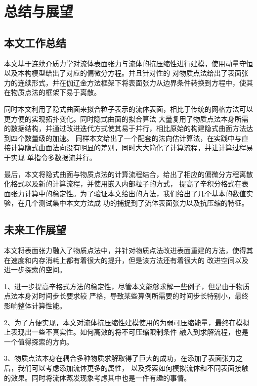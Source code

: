 \chapter{总结与展望}
\section{本文工作总结}
本文基于连续介质力学对流体表面张力与流体的抗压缩性进行建模，使用动量守恒以及本构模型给出了对应的偏微分方程。并且针对性的
对物质点法给出了表面张力的连续形式，并在伽辽金方法框架下将表面张力从边界条件转换到方程中，使其在物质点法的框架下易于离散。

同时本文利用了隐式曲面来拟合粒子表示的流体表面，相比于传统的网格方法可以更方便的实现拓扑变化。同时隐式曲面的拟合算法
大量复用了物质点法本身所需的数据结构，并通过改进迭代方式使其易于并行，相比原始的构建隐式曲面方法达到四个数量级的加速。
同样本文给出了一个配套的法向估计算法，在实践中与直接计算隐式曲面法向没有明显的差别，同时大大简化了计算流程，并让计算过程易于实现
单指令多数据流并行。

最后，本文将隐式曲面与物质点法的计算流程结合，给出了相应的偏微分方程离散化格式以及新的计算流程，并使用嵌入内部粒子的方式，
提高了辛积分格式在表面张力计算中的稳定性。为了验证本文给出的方法，我们给出了几个基本的数值实验，在几个测试集中本文方法成
功的捕捉到了流体表面张力以及抗压缩的特征。
\section{未来工作展望}
本文将表面张力融入了物质点法中，并针对物质点法改进表面重建的方法，使得其在速度和内存消耗上都有着很大的提升，但是该方法还有着很大的
改进空间以及进一步探索的空间。

1、进一步提高辛格式方法的稳定性，尽管本文能够求解一些例子，但是由于物质点法本身对时间步长要求较
严格，导致某些算例所需要的时间步长特别小，最终影响整体计算性能。

2、为了方便实现，本文对流体抗压缩性建模使用的为弱可压缩能量，最终在模拟上表现出一些不真实性。如何高效的将不可压缩限制条件
融入到求解流程，也是一个值得探索的方向。

3、物质点法本身在耦合多种物质求解取得了巨大的成功，在添加了表面张力之后，我们可以考虑添加流体更多的属性，
以及探索如何模拟流体和不同表面接触的效果。同时将流体蒸发现象考虑其中也是一件有趣的事情。
